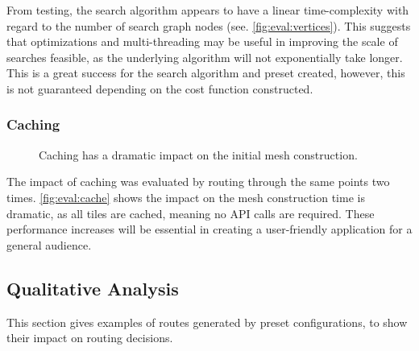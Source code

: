 \documentclass[12pt]{article}
\begin{document}
From testing, the search algorithm appears to have a linear time-complexity with regard to the number of search graph nodes (see. \autoref{fig:eval:vertices}). This suggests that optimizations and multi-threading may be useful in improving the scale of searches feasible, as the underlying algorithm will not exponentially take longer. This is a great success for the search algorithm and preset created, however, this is not guaranteed depending on the cost function constructed.

\subsubsection{Caching}

\begin{figure}[H]
  \centering
  \caption{Caching has a dramatic impact on the initial mesh construction.}
  \label{fig:eval:cache}
\end{figure}

The impact of caching was evaluated by routing through the same points two times. \autoref{fig:eval:cache} shows the impact on the mesh construction time is dramatic, as all tiles are cached, meaning no API calls are required. These performance increases will be essential in creating a user-friendly application for a general audience.

\subsection{Qualitative Analysis}

This section gives examples of routes generated by preset configurations, to show their impact on routing decisions.
\end{document}
